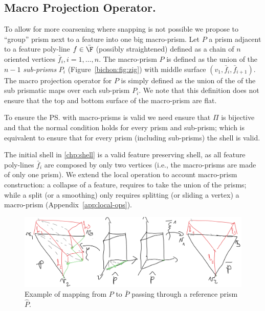 \subsection{Macro Projection Operator.}\label{cumin:sec:macro}
To allow for more coarsening where snapping is not possible we propose to ``group'' prism next to a feature into one big macro-prism.
Let $P$ a prism adjacent to a feature poly-line $f\in\bar\F$ (possibly straightened) defined as a chain of $n$ oriented vertices $\bar f_i, i=1,\dots,n$. The macro-prism $P$ is defined as the union of the $n-1$ \emph{sub-prisms} $P_i$ (Figure~\ref{bichon:fig:zig}) with middle surface $(v_1, \bar f_i, \bar f_{i+1})$. The macro projection operator for $P$ is simply defined as the union of the of the sub prismatic maps over each sub-prism $P_i$. We note that this definition does not ensure that the top and bottom surface of the macro-prism are flat.


To ensure the \ps{} with macro-prisms is valid we need ensure that $\Pi$ is bijective and that the normal condition holds for every prism and sub-prism; which is equivalent to ensure that for every prism (including sub-prisms) the shell is valid.

The initial shell in \ref{chp:shell} is a valid feature preserving shell, as all feature poly-lines $\bar f_i$ are composed by only two vertices (i.e., the macro-prisms are made of only one prism). We extend the local operation to account macro-prism construction: a collapse of a feature, requires to take the union of the prisms; while a split (or a smoothing) only requires splitting (or sliding a vertex) a macro-prism (Appendix~\ref{app:local-ops}).


\begin{figure}
    \centering
    \includegraphics[width=\linewidth]{curve_meshing_in_shell_tex/figs/mappings}
    \caption{Example of mapping from $P$ to $\bar P$ passing through a reference prism $\hat P$.}
    \label{bichon:fig:ref-mapping}
\end{figure}